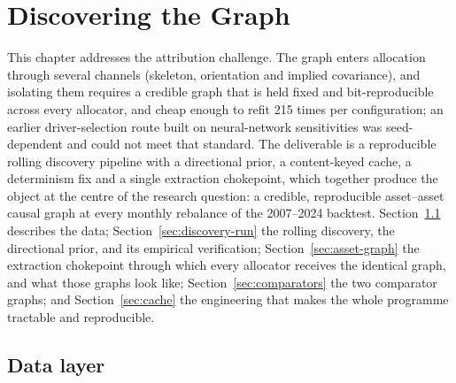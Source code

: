 \chapter{Discovering the Graph}
\label{chap:discovery}

This chapter addresses the attribution challenge. The graph enters allocation
through several channels (skeleton, orientation and implied covariance), and
isolating them requires a credible graph that is held fixed and
bit-reproducible across every allocator, and cheap enough to refit 215 times
per configuration; an earlier driver-selection route built on neural-network
sensitivities was seed-dependent and could not meet that standard. The
deliverable is a reproducible rolling discovery pipeline with a directional
prior, a content-keyed cache, a determinism fix and a single extraction
chokepoint, which together produce the object at the centre of the research
question: a credible, reproducible asset--asset causal graph at every monthly
rebalance of the 2007--2024 backtest.
Section~\ref{sec:data} describes the data; Section~\ref{sec:discovery-run} the
rolling discovery, the directional prior, and its empirical verification;
Section~\ref{sec:asset-graph} the extraction chokepoint through which every
allocator receives the identical graph, and what those graphs look like;
Section~\ref{sec:comparators} the two comparator graphs; and
Section~\ref{sec:cache} the engineering
that makes the whole programme tractable and reproducible.

\section{Data layer}
\label{sec:data}

